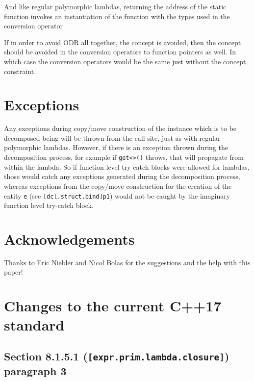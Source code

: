 \documentclass{article}
\begin{document}
And like regular polymorphic lambdas, returning the address of the static
function invokes an instantiation of the function with the types used in the
conversion operator

If in order to avoid ODR all together, the concept is avoided, then the
concept should be avoided in the conversion operators to function pointers as
well.  In which case the conversion operators would be the same just without
the concept constraint.

\section{Exceptions}
Any exceptions during copy/move construction of the instance which is to be
decomposed being will be thrown from the call site, just as with regular
polymorphic lambdas.  However, if there is an exception thrown during the
decomposition process, for example if \texttt{get<>()} throws, that will
propagate from within the lambda.  So if function level try catch blocks were
allowed for lambdas, those would catch any exceptions generated during the
decomposition process, whereas exceptions from the copy/move construction for
the creation of the entity \texttt{e} (see \texttt{[dcl.struct.bind]p1}) would
not be caught by the imaginary function level try-catch block.


\section{Acknowledgements}

Thanks to Eric Niebler and Nicol Bolas for the suggestions and the help with
this paper!


\section{Changes to the current C++17 standard}
\subsection{Section 8.1.5.1 (\texttt{[expr.prim.lambda.closure]}) paragraph 3}
\end{document}
